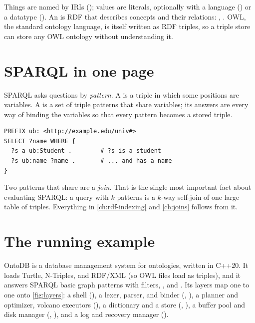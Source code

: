 Things are named by IRIs (); values are literals, optionally
with a language () or a datatype ().
An  is RDF that describes concepts and their relations:
, . OWL, the
standard ontology language, is itself written as RDF triples, so a triple store
can store any OWL ontology without understanding it.

\section{SPARQL in one page}

SPARQL asks questions by \emph{pattern}. A  is a triple in
which some positions are variables. A  is a set of
triple patterns that share variables; its answers are every way of binding the
variables so that every pattern becomes a stored triple.

\begin{lstlisting}
PREFIX ub: <http://example.edu/univ#>
SELECT ?name WHERE {
  ?s a ub:Student .        # ?s is a student
  ?s ub:name ?name .       # ... and has a name
}
\end{lstlisting}

Two patterns that share  are a \emph{join}. That is the single most
important fact about evaluating SPARQL: a query with $k$ patterns is a $k$-way
self-join of one large table of triples. Everything in \cref{ch:rdf-indexing}
and \cref{ch:joins} follows from it.

\section{The running example}

\begin{ontodb}
OntoDB is a database management system for ontologies, written in C++20. It
loads Turtle, N-Triples, and RDF/XML (so OWL files load as triples), and it
answers SPARQL basic graph patterns with filters, , and
. Its layers map one to one onto \cref{fig:layers}:
a shell (), a lexer, parser, and binder (,
), a planner and optimizer, volcano executors
(), a dictionary and a store (,
), a buffer pool and disk manager (,
), and a log and recovery manager ().
\end{ontodb}

